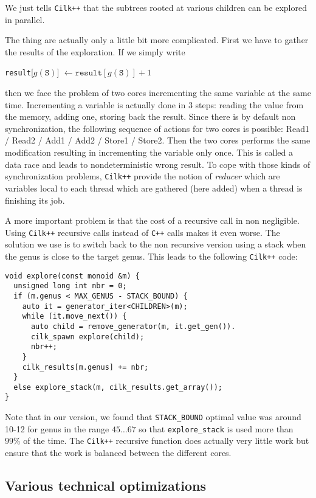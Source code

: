 \documentclass[reqno,11pt]{amsart}
\theoremstyle{plain}
\theoremstyle{definition}
\newcommand{\CilkP}{\texttt{Cilk++}\xspace}
\newcommand{\CPP}{\texttt{C++}\xspace}
\renewcommand{\tt}[1]{\texttt{#1}}
\begin{document}
We just tells \CilkP that the subtrees rooted at various children can be
explored in parallel.

The thing are actually only a little bit more complicated. First we have to
gather the results of the exploration. If we simply write
\begin{center}
\tt{result}[$g(\tt{S})$] $\gets \tt{result}[g(\tt{S})] + 1$
\end{center}
then we face the problem of two cores incrementing the same variable at the
same time.
 Incrementing a variable is actually done in 3 steps: reading the
value from the memory, adding one, storing back the result. 
Since there is by
default non synchronization, the following sequence of actions for two cores
 is possible: Read1 / Read2 / Add1 / Add2 / Store1 / Store2. Then the two
cores performs the same modification resulting in incrementing the variable
only once. This is called a data race and leads to nondeterministic wrong
result. To cope with those kinds of synchronization problems, \CilkP provide the
notion of \emph{reducer} which are variables local to each thread which are
gathered (here added) when a thread is finishing its job.

A more important problem is that the cost of a recursive call in non
negligible. Using \CilkP recursive calls instead of \CPP calls makes
it even worse. The solution we use is to switch back to the non recursive
version using a stack when the genus is close to the target genus. This leads
to the following \CilkP code:
{\small
\begin{verbatim}
void explore(const monoid &m) {
  unsigned long int nbr = 0;
  if (m.genus < MAX_GENUS - STACK_BOUND) {
    auto it = generator_iter<CHILDREN>(m);
    while (it.move_next()) {
      auto child = remove_generator(m, it.get_gen()).
      cilk_spawn explore(child);
      nbr++;
    }
    cilk_results[m.genus] += nbr;
  }
  else explore_stack(m, cilk_results.get_array());
}
\end{verbatim}
}
Note that in our version, we found that \tt{STACK\_BOUND} optimal value was
around 10-12 for genus in the range $45\dots 67$ so that \tt{explore\_stack}
is used more than $99\%$ of the time. The \CilkP recursive function does
actually very little work but ensure that the work is balanced between the
different cores.

\subsection{Various technical optimizations}
\end{document}
